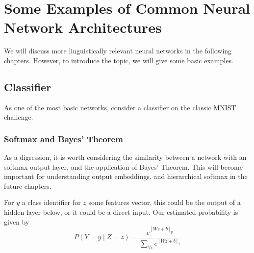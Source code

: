 \documentclass[12pt,parskip]{komatufte}
\begin{document}





\section{Some Examples of Common Neural Network Architectures}
We will discuss more linguistically relevant neural networks in the following chapters.
However, to introduce the topic, we will give some basic examples.


\subsection{Classifier}\label{sec:classifier}
As one of the most basic networks, consider a classifier on the classic MNIST challenge.






\subsubsection{Softmax and Bayes' Theorem}\label{sec:softmax-and-bayes-theorem}
As a digression, it is worth considering the similarity between a network with an softmax output layer, and the application of Bayes' Theorem.
This will become important for understanding output embeddings, and hierarchical softmax in the future chapters.

For $y$ a class identifier
for $z$ some features vector, this could be the output of a hidden layer below, or it could be a direct input.
Our estimated probability is given by
\begin{equation}
P(Y=y\mid Z=z)=\frac{e^{[Wz+b]_{y}}}{\sum_{\forall i}e^{[Wz+b]_{i}}}
\end{equation}
\end{document}
